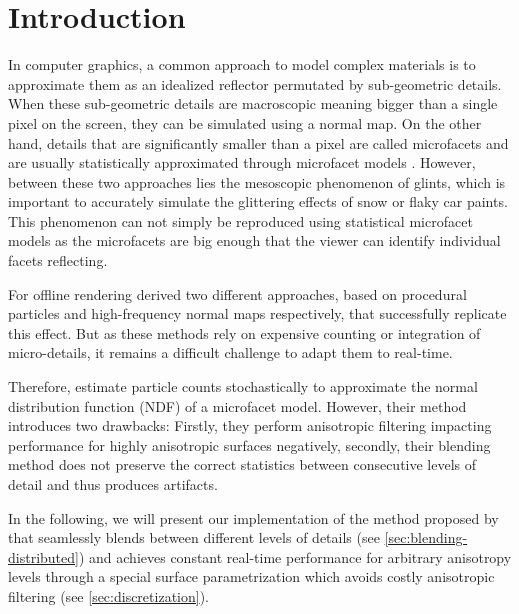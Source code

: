\section{Introduction}
\label{sec:introduction}

In computer graphics, a common approach to model complex materials is to approximate them as an idealized reflector permutated by sub-geometric details.
%
When these sub-geometric details are macroscopic meaning bigger than a single pixel on the screen, they can be simulated using a normal map.
%
On the other hand, details that are significantly smaller than a pixel are called microfacets and are usually statistically approximated through microfacet models \parencite{cook1982}.
%
However, between these two approaches lies the mesoscopic phenomenon of glints, which is important to accurately simulate the glittering effects of snow or flaky car paints.
%
This phenomenon can not simply be reproduced using statistical microfacet models as the microfacets are big enough that the viewer can identify individual facets reflecting.

For offline rendering \textcite{jakob2014,yan2014} derived two different approaches, based on procedural particles and high-frequency normal maps respectively, that successfully replicate this effect.
%
But as these methods rely on expensive counting or integration of micro-details, it remains a difficult challenge to adapt them to real-time.

Therefore, \textcite{zirr2016} estimate particle counts stochastically to approximate the normal distribution function (NDF) of a microfacet model.
%
However, their method introduces two drawbacks: Firstly, they perform anisotropic filtering impacting performance for highly anisotropic surfaces negatively, secondly, their blending method does not preserve the correct statistics between consecutive levels of detail and thus produces artifacts.

In the following, we will present our implementation of the method proposed by \textcite{deliot2023} that seamlessly blends between different levels of details (see \cref{sec:blending-distributed}) and achieves constant real-time performance for arbitrary anisotropy levels through a special surface parametrization which avoids costly anisotropic filtering (see \cref{sec:discretization}).

